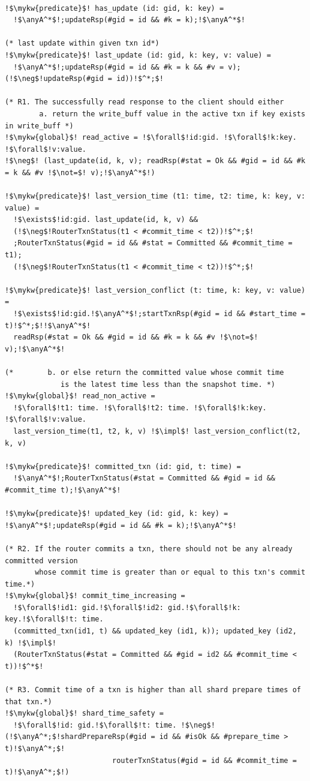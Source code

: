 \begin{verbatim}

!$\mykw{predicate}$! has_update (id: gid, k: key) =
  !$\anyA^*$!;updateRsp(#gid = id && #k = k);!$\anyA^*$!

(* last update within given txn id*)
!$\mykw{predicate}$! last_update (id: gid, k: key, v: value) =
  !$\anyA^*$!;updateRsp(#gid = id && #k = k && #v = v);(!$\neg$!updateRsp(#gid = id))!$^*;$!

(* R1. The successfully read response to the client should either
        a. return the write_buff value in the active txn if key exists in write_buff *)
!$\mykw{global}$! read_active = !$\forall$!id:gid. !$\forall$!k:key. !$\forall$!v:value. 
!$\neg$! (last_update(id, k, v); readRsp(#stat = Ok && #gid = id && #k = k && #v !$\not=$! v);!$\anyA^*$!)

!$\mykw{predicate}$! last_version_time (t1: time, t2: time, k: key, v: value) =
  !$\exists$!id:gid. last_update(id, k, v) &&
  (!$\neg$!RouterTxnStatus(t1 < #commit_time < t2))!$^*;$!
  ;RouterTxnStatus(#gid = id && #stat = Committed && #commit_time = t1);
  (!$\neg$!RouterTxnStatus(t1 < #commit_time < t2))!$^*;$!

!$\mykw{predicate}$! last_version_conflict (t: time, k: key, v: value) =
  !$\exists$!id:gid.!$\anyA^*$!;startTxnRsp(#gid = id && #start_time = t)!$^*;$!!$\anyA^*$!
  readRsp(#stat = Ok && #gid = id && #k = k && #v !$\not=$! v);!$\anyA^*$!

(*        b. or else return the committed value whose commit time 
             is the latest time less than the snapshot time. *)
!$\mykw{global}$! read_non_active =
  !$\forall$!t1: time. !$\forall$!t2: time. !$\forall$!k:key. !$\forall$!v:value.
  last_version_time(t1, t2, k, v) !$\impl$! last_version_conflict(t2, k, v)

!$\mykw{predicate}$! committed_txn (id: gid, t: time) =
  !$\anyA^*$!;RouterTxnStatus(#stat = Committed && #gid = id && #commit_time t);!$\anyA^*$!

!$\mykw{predicate}$! updated_key (id: gid, k: key) = !$\anyA^*$!;updateRsp(#gid = id && #k = k);!$\anyA^*$!

(* R2. If the router commits a txn, there should not be any already committed version 
       whose commit time is greater than or equal to this txn's commit time.*)
!$\mykw{global}$! commit_time_increasing =
  !$\forall$!id1: gid.!$\forall$!id2: gid.!$\forall$!k: key.!$\forall$!t: time.
  (committed_txn(id1, t) && updated_key (id1, k)); updated_key (id2, k) !$\impl$!
  (RouterTxnStatus(#stat = Committed && #gid = id2 && #commit_time < t))!$^*$!

(* R3. Commit time of a txn is higher than all shard prepare times of that txn.*)
!$\mykw{global}$! shard_time_safety =
  !$\forall$!id: gid.!$\forall$!t: time. !$\neg$!(!$\anyA^*;$!shardPrepareRsp(#gid = id && #isOk && #prepare_time > t)!$\anyA^*;$!
                         routerTxnStatus(#gid = id && #commit_time = t)!$\anyA^*;$!)
\end{verbatim}

